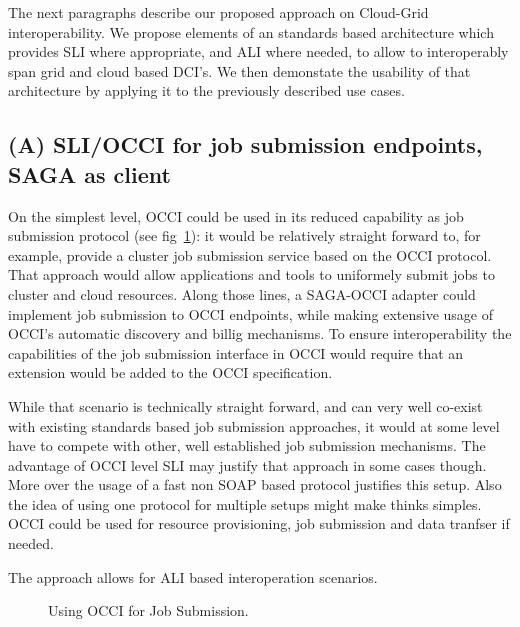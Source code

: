 \documentclass[10pt,conference,final,letterpaper,twoside,twocolumn,]{IEEEtran}
\begin{document}
 The next paragraphs describe our proposed approach on Cloud-Grid
 interoperability.  We propose elements of an standards based
 architecture which provides  SLI where appropriate, and ALI where
 needed, to allow to interoperably span grid and cloud based DCI's.
 We then demonstate the usability of that architecture by applying it
 to the previously described use cases.


 \subsection{(A) SLI/OCCI for job submission endpoints, SAGA as client}

 On the simplest level, OCCI could be used in its reduced capability
 as job submission protocol (see fig~\ref{fig:arch1}): it would be
 relatively straight forward to, for example, provide a cluster job
 submission service based on the OCCI protocol. That approach would
 allow applications and tools to uniformely submit jobs to cluster and
 cloud resources.  Along those lines, a SAGA-OCCI adapter could
 implement job submission to OCCI endpoints, while making extensive
 usage of OCCI's automatic discovery and billig mechanisms. To ensure
 interoperability the capabilities of the job submission interface in
 OCCI would require that an extension would be added to the OCCI
 specification.

 While that scenario is technically straight forward, and can very
 well co-exist with existing standards based job submission
 approaches, it would at some level have to compete with other, well
 established job submission mechanisms.  The advantage of OCCI level
 SLI may justify that approach in some cases though. More over the
 usage of a fast non SOAP based protocol justifies this setup. Also
 the idea of using one protocol for multiple setups might make thinks
 simples. OCCI could be used for resource provisioning, job submission
 and data tranfser if needed.

 The approach allows for ALI based interoperation scenarios.

\begin{figure}[htb]
 \caption{\label{fig:arch1} Using OCCI for Job Submission.}
\end{figure}
\end{document}
